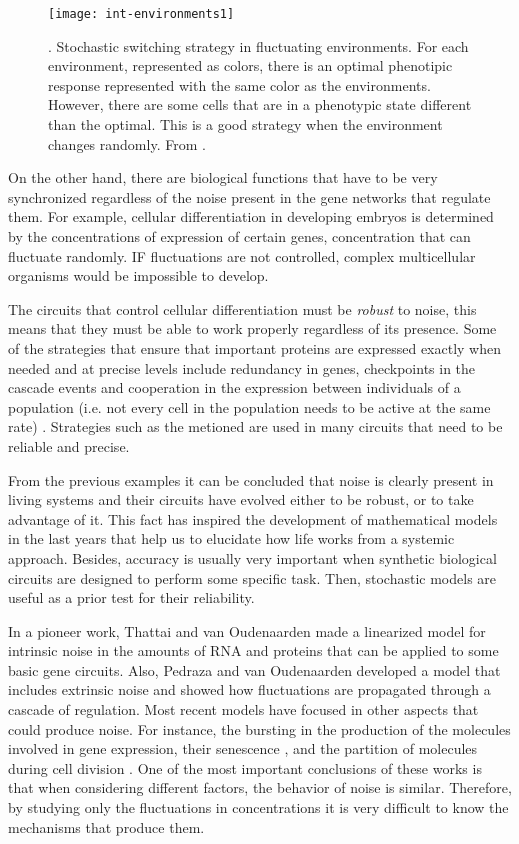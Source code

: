 \begin{figure}[H]
  \centering
  \texttt{[image: int-environments1]}
  \caption[Stochastic switching strategy in fluctuating environments]{\label{fig:int-environments1}. Stochastic switching strategy in fluctuating environments. For each environment, represented as colors, there is an optimal phenotipic response represented with the same color as the environments. However, there are some cells that are in a phenotypic state different than the optimal. This is a good strategy when the environment changes randomly. From \cite{kussell05}.}
\end{figure}

On the other hand, there are biological functions that have to be very synchronized regardless of the noise present in the gene networks that regulate them. For example, cellular differentiation in developing embryos is determined by the concentrations of expression of certain genes, concentration that can fluctuate randomly. IF fluctuations are not controlled, complex multicellular organisms would be impossible to develop. 

The circuits that control cellular differentiation must be \textit{robust} to noise, this means that they must be able to work properly regardless of its presence. Some of the strategies that ensure that important proteins are expressed exactly when needed and at precise levels include redundancy in genes, checkpoints in the cascade events and cooperation in the expression between individuals of a population (i.e. not every cell in the population needs to be active at the same rate) \cite{mcadams99}. Strategies such as the metioned are used in many circuits that need to be reliable and precise.

From the previous examples it can be concluded that noise is clearly present in living systems and their circuits have evolved either to be robust, or to take advantage of it. This fact has inspired the development of mathematical models in the last years that help us to elucidate how life works from a systemic approach. Besides, accuracy is usually very important when synthetic biological circuits are designed to perform some specific task. Then, stochastic models are useful as a prior test for their reliability.

In a pioneer work, Thattai and van Oudenaarden \cite{thattai01} made a linearized model for intrinsic noise in the amounts of RNA and proteins that can be applied to some basic gene circuits. Also, Pedraza and van Oudenaarden \cite{pedraza05} developed a model that includes extrinsic noise and showed how fluctuations are propagated through a cascade of regulation. Most recent models have focused in other aspects that could produce noise. For instance, the bursting in the production of the molecules involved in gene expression, their senescence \cite{pedraza08}, and the partition of molecules during cell division \cite{huh11a} \cite{huh11b}. One of the most important conclusions of these works is that when considering different factors, the behavior of noise is similar. Therefore, by studying only the fluctuations in concentrations it is very difficult to know the mechanisms that produce them.

